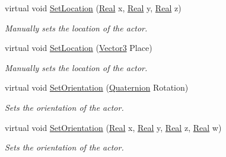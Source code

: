 \begin{DoxyCompactItemize}
virtual void \hyperlink{classMezzanine_1_1ActorSoft_aad9c559bae769ac44d437a0612934bc2}{SetLocation} (\hyperlink{namespaceMezzanine_a726731b1a7df72bf3583e4a97282c6f6}{Real} x, \hyperlink{namespaceMezzanine_a726731b1a7df72bf3583e4a97282c6f6}{Real} y, \hyperlink{namespaceMezzanine_a726731b1a7df72bf3583e4a97282c6f6}{Real} z)
\begin{DoxyCompactList}\small\item\em Manually sets the location of the actor. \item\end{DoxyCompactList}\item 
virtual void \hyperlink{classMezzanine_1_1ActorSoft_a9c96f61e8a39fc6b35eb35c03b8e0e42}{SetLocation} (\hyperlink{classMezzanine_1_1Vector3}{Vector3} Place)
\begin{DoxyCompactList}\small\item\em Manually sets the location of the actor. \item\end{DoxyCompactList}\item 
virtual void \hyperlink{classMezzanine_1_1ActorSoft_a3490444768316d69b5560d3500550a4f}{SetOrientation} (\hyperlink{classMezzanine_1_1Quaternion}{Quaternion} Rotation)
\begin{DoxyCompactList}\small\item\em Sets the orientation of the actor. \item\end{DoxyCompactList}\item 
virtual void \hyperlink{classMezzanine_1_1ActorSoft_aa203dd4d6bde54f4551673e2690f20b8}{SetOrientation} (\hyperlink{namespaceMezzanine_a726731b1a7df72bf3583e4a97282c6f6}{Real} x, \hyperlink{namespaceMezzanine_a726731b1a7df72bf3583e4a97282c6f6}{Real} y, \hyperlink{namespaceMezzanine_a726731b1a7df72bf3583e4a97282c6f6}{Real} z, \hyperlink{namespaceMezzanine_a726731b1a7df72bf3583e4a97282c6f6}{Real} w)
\begin{DoxyCompactList}\small\item\em Sets the orientation of the actor. \item\end{DoxyCompactList}\end{DoxyCompactItemize}
